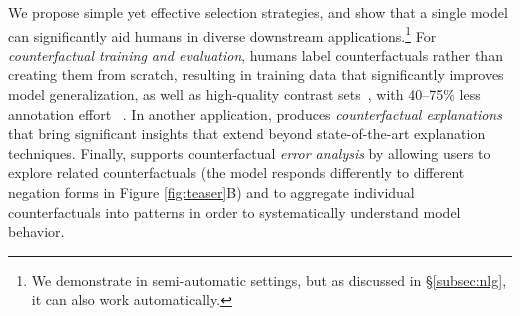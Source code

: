 We propose simple yet effective selection strategies, and show that a single \sysname model can significantly aid humans in diverse downstream applications.\footnote{We demonstrate \sysname in semi-automatic settings, but as discussed in \S\ref{subsec:nlg}, it can also work automatically.} 
For \emph{counterfactual training and evaluation}, humans label \sysname counterfactuals rather than creating them from scratch, resulting in training data that significantly improves model generalization, as well as high-quality contrast sets~\cite{gardner2020contrast}, with 40--75\% less annotation effort ~\cite{kaushik2019learning}. In another application, \sysname produces \emph{counterfactual explanations} that bring significant insights that extend beyond state-of-the-art explanation techniques. Finally, \sysname supports counterfactual \emph{error analysis} by allowing users to explore related counterfactuals (\eg the model responds differently to different negation forms in Figure \ref{fig:teaser}B) and to aggregate individual counterfactuals into patterns in order to systematically understand model behavior.





